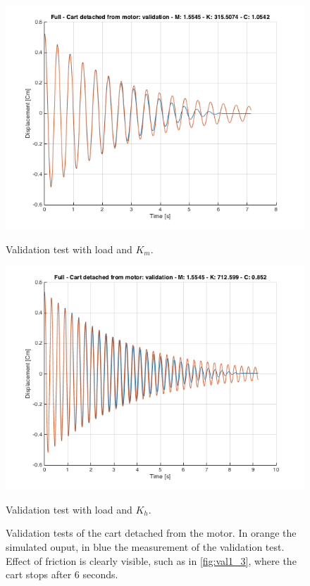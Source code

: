 \begin{figure} [!h]
\vspace*{0.5cm} %
\begin{minipage}[t]{0.45\textwidth}
\includegraphics[width=\linewidth]{img/validation_ml_km_full.png}
\caption{Validation test with  load and $K_m$.}
\label{fig:val1_3}
\end{minipage}
\hspace{\fill}
\begin{minipage}[t]{0.45\textwidth}
\includegraphics[width=\linewidth]{img/validation_ml_kh_full.png}
\caption{Validation test with  load and $K_h$.}
\label{fig:val1_4}
\end{minipage}
\caption{Validation tests of the cart detached from the motor. In orange the simulated ouput, in blue the measurement of the validation test. Effect of friction is clearly visible, such as in \ref{fig:val1_3}, where the cart stops after $6$ seconds.}
\label{fig:val1}
\end{figure}

